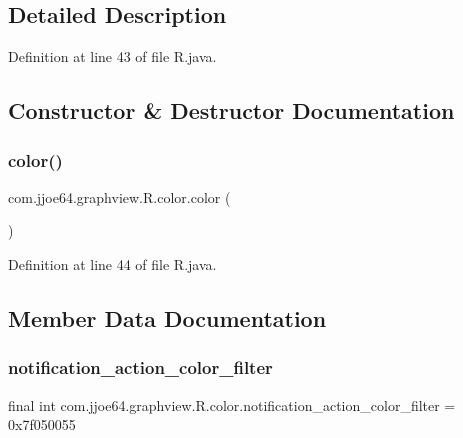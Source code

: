 \subsection{Detailed Description}


Definition at line 43 of file R.\+java.



\subsection{Constructor \& Destructor Documentation}
\mbox{\label{classcom_1_1jjoe64_1_1graphview_1_1_r_1_1color_ac6f5283346847dbf4143f6a0605c87e2}} 
\subsubsection{\texorpdfstring{color()}{color()}}
{\footnotesize\ttfamily com.\+jjoe64.\+graphview.\+R.\+color.\+color (\begin{DoxyParamCaption}{ }\end{DoxyParamCaption})\hspace{0.3cm}{\ttfamily [private]}}



Definition at line 44 of file R.\+java.


\begin{DoxyCode}{0}

\end{DoxyCode}


\subsection{Member Data Documentation}
\mbox{\label{classcom_1_1jjoe64_1_1graphview_1_1_r_1_1color_a47b98feca837fc91ffd918924ef8bf05}} 
\subsubsection{\texorpdfstring{notification\_action\_color\_filter}{notification\_action\_color\_filter}}
{\footnotesize\ttfamily final int com.\+jjoe64.\+graphview.\+R.\+color.\+notification\+\_\+action\+\_\+color\+\_\+filter = 0x7f050055\hspace{0.3cm}{\ttfamily [static]}}



